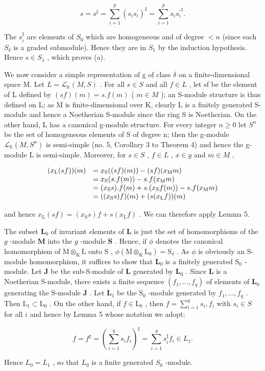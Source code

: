 \[
s = s ^ {\sharp} = \sum_ {i = 1} ^ {p} (s _ {i} s _ {i} ^ {\prime}) ^ {\sharp} = \sum_ {i = 1} ^ {p} s _ {i} {s _ {i} ^ {\prime}} ^ {\sharp}.
\]

The \(s_i^\sharp\) are elements of \(S_0\) which are homogeneous and of degree \(< n\) (since each \(S_\delta\) is a graded submodule). Hence they are in \(S_1\) by the induction hypothesis. Hence \(s \in S_1\) , which proves (a).

We now consider a simple representation of g of class \(\delta\) on a finite-dimensional space M. Let \(L = \mathcal{L}_{\mathbb{K}}(M, S)\) . For all \(s \in S\) and all \(f \in L\) , let sf be the element of L defined by \((sf)(m) = s.f(m)\) ( \(m \in M\) ); an S-module structure is thus defined on L; as M is finite-dimensional over K, clearly L is a finitely generated S-module and hence a Noetherian S-module since the ring S is Noetherian. On the other hand, L has a canonical g-module structure. For every integer \(n \geqslant 0\) let \(S^{n}\) be the set of homogeneous elements of S of degree n; then the g-module \(\mathcal{L}_{\mathbb{K}}(M, S^{n})\) is semi-simple (no. 5, Corollary 3 to Theorem 4) and hence the g-module L is semi-simple. Moreover, for \(s \in S\) , \(f \in L\) , \(x \in g\) and \(m \in M\) ,

\[
\begin{array}{r l} (x _ {\mathrm{L}} (s f)) (m) & = x _ {\mathrm{S}} ((s f) (m)) - (s f) (x _ {\mathrm{M}} m) \\ & = x _ {\mathrm{S}} (s. f (m)) - s. f (x _ {\mathrm{M}} m) \\ & = (x _ {\mathrm{S}} s). f (m) + s. (x _ {\mathrm{S}} f (m)) - s. f (x _ {\mathrm{M}} m) \\ & = ((x _ {\mathrm{S}} s) f) (m) + (s (x _ {\mathrm{L}} f)) (m) \end{array}
\]

and hence \(x_{\mathrm{L}}(sf) = (x_{\mathrm{S}}s)f + s(x_{\mathrm{L}}f)\) . We can therefore apply Lemma 5.

The subset \(\mathbf{L}_0\) of invariant elements of \(\mathbf{L}\) is just the set of homomorphisms of the \(g\) -module \(\mathbf{M}\) into the \(g\) -module \(\mathbf{S}\) . Hence, if \(\phi\) denotes the canonical homomorphism of \(\mathrm{M} \otimes_{\mathrm{K}} \mathrm{L}\) onto \(\mathrm{S}\) , \(\phi(\mathrm{M} \otimes_{\mathrm{K}} \mathrm{L}_0) = \mathrm{S}_{\delta}\) . As \(\phi\) is obviously an S-module homomorphism, it suffices to show that \(\mathbf{L}_0\) is a finitely generated \(\mathrm{S}_0\) -module. Let \(\mathbf{J}\) be the sub-S-module of \(\mathbf{L}\) generated by \(\mathbf{L}_0\) . Since \(\mathbf{L}\) is a Noetherian S-module, there exists a finite sequence \((f_1, \ldots, f_q)\) of elements of \(\mathbf{L}_0\) generating the S-module \(\mathbf{J}\) . Let \(\mathbf{L}_1\) be the \(\mathrm{S}_0\) -module generated by \(f_{1},\ldots ,f_{q}\) . Then \(\mathrm{L}_1\subset \mathrm{L}_0\) . On the other hand, if \(f\in \mathrm{L}_0\) , then \(f = \sum_{i = 1}^{q}s_{i},f_{i}\) with \(s_i\in S\) for all \(i\) and hence by Lemma 5 whose notation we adopt:

\[
f = f ^ {\sharp} = \left(\sum_ {i = 1} ^ {q} s _ {i} f _ {i}\right) ^ {\sharp} = \sum_ {i = 1} ^ {q} s _ {i} ^ {\sharp} f _ {i} \in L _ {1}.
\]

Hence \(L_{0} = L_{1}\) , so that \(L_{0}\) is a finite generated \(S_{0}\) -module.

